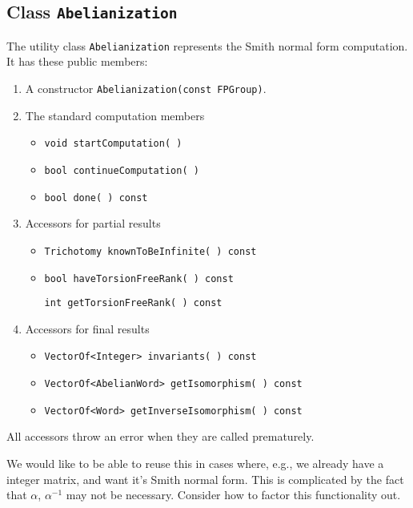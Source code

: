 \subsection{Class {\tt Abelianization}}

The utility class {\tt Abelianization} represents the Smith normal
form computation. It has these public members:

\begin{enumerate}

\item
A constructor {\tt Abelianization(const FPGroup)}.

\item
The standard computation members

\begin{itemize}
\item
{\tt void startComputation( )}
\item
{\tt bool continueComputation( )}
\item
{\tt bool done( ) const}
\end{itemize}

\item
Accessors for partial results

\begin{itemize}
\item
{\tt Trichotomy knownToBeInfinite( ) const}
\item
{\tt bool haveTorsionFreeRank( ) const}

{\tt int getTorsionFreeRank( ) const}
\end{itemize}

\item
Accessors for final results

\begin{itemize}
\item
{\tt VectorOf<Integer> invariants( ) const}
\item
{\tt VectorOf<AbelianWord> getIsomorphism( ) const}
\item
{\tt VectorOf<Word> getInverseIsomorphism( ) const}
\end{itemize}

\end{enumerate}

All accessors throw an error when they are called prematurely.

We would like to be able to reuse this in cases where, e.g., we
already have a integer matrix, and want it's Smith normal form. This
is complicated by the fact that $\alpha$, $\alpha^{-1}$ may not be
necessary. Consider how to factor this functionality out.

